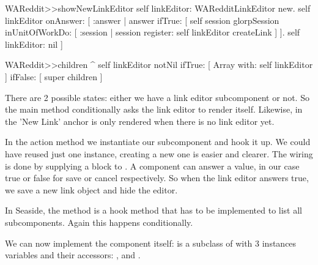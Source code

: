 \documentclass[a4paper,10pt,twoside]{book}
\begin{document}
\begin{code}{}
WAReddit>>showNewLinkEditor
     self linkEditor: WARedditLinkEditor new. 
     self linkEditor onAnswer: [ :answer |
          answer ifTrue: [ 
               self session glorpSession inUnitOfWorkDo: [ :session |
                    session register: self linkEditor createLink ] ]. 
          self linkEditor: nil ]
\end{code}


\begin{code}{}
WAReddit>>children
    ^ self linkEditor notNil 
        ifTrue: [ Array with: self linkEditor ] 
        ifFalse: [ super children ]
\end{code}

There are 2 possible states: either we have a link editor subcomponent or not. So the main  method conditionally asks the link editor to render itself. Likewise, in  the 'New Link' anchor is only rendered when there is no link editor yet.

In the  action method we instantiate our subcomponent and hook it up. We could have reused just one instance, creating a new one is easier and clearer. The wiring is done by supplying a block to . A component can answer a value, in our case true or false for save or cancel respectively. So when the link editor answers true, we save a new link object and hide the editor.

In Seaside, the  method is a hook method that has to be implemented to list all subcomponents. Again this happens conditionally.

We can now implement the component itself:  is a subclass of  with 3 instances variables and their accessors: ,  and .



\ifx\wholebook\relax\else
    
    
\end{document}
